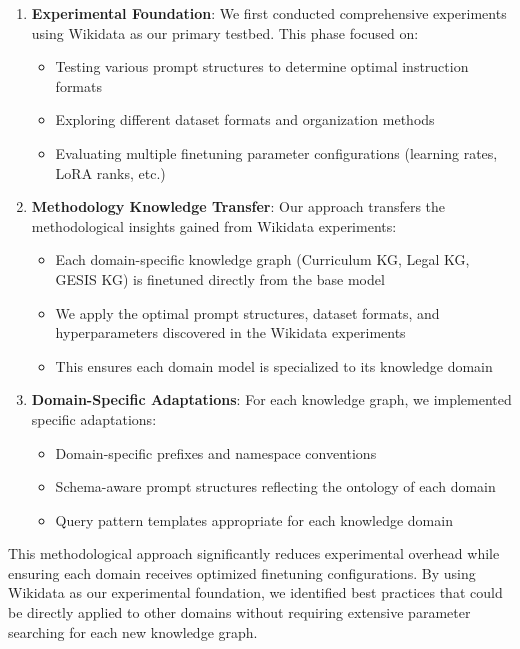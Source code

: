 \begin{enumerate}
    \item \textbf{Experimental Foundation}: We first conducted comprehensive experiments using Wikidata as our primary testbed. This phase focused on:
    \begin{itemize}
        \item Testing various prompt structures to determine optimal instruction formats
        \item Exploring different dataset formats and organization methods
        \item Evaluating multiple finetuning parameter configurations (learning rates, LoRA ranks, etc.)
    \end{itemize}
    
    \item \textbf{Methodology Knowledge Transfer}: Our approach transfers the methodological insights gained from Wikidata experiments:
    \begin{itemize}
        \item Each domain-specific knowledge graph (Curriculum KG, Legal KG, GESIS KG) is finetuned directly from the base model
        \item We apply the optimal prompt structures, dataset formats, and hyperparameters discovered in the Wikidata experiments
        \item This ensures each domain model is specialized to its knowledge domain
    \end{itemize}
    
    \item \textbf{Domain-Specific Adaptations}: For each knowledge graph, we implemented specific adaptations:
    \begin{itemize}
        \item Domain-specific prefixes and namespace conventions
        \item Schema-aware prompt structures reflecting the ontology of each domain
        \item Query pattern templates appropriate for each knowledge domain
    \end{itemize}
\end{enumerate}

This methodological approach significantly reduces experimental overhead while ensuring each domain receives optimized finetuning configurations. By using Wikidata as our experimental foundation, we identified best practices that could be directly applied to other domains without requiring extensive parameter searching for each new knowledge graph.

